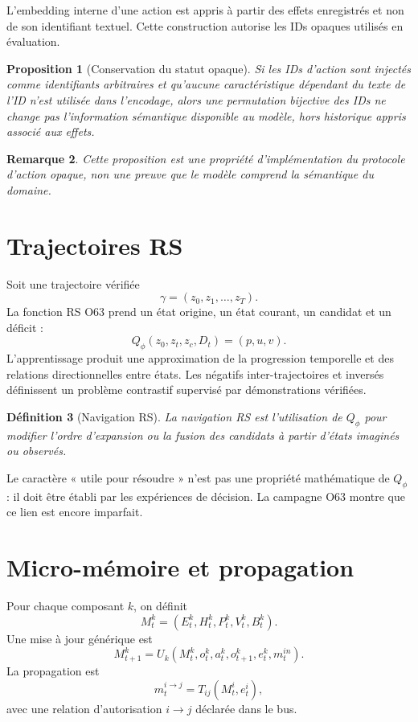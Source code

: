 \documentclass[11pt,a4paper]{article}
\newtheorem{definition}{Définition}[section]
\newtheorem{proposition}[definition]{Proposition}
\newtheorem{remark}[definition]{Remarque}
\begin{document}
L’embedding interne d’une action est appris à partir des effets enregistrés et non de son identifiant textuel. Cette construction autorise les IDs opaques utilisés en évaluation.

\begin{proposition}[Conservation du statut opaque]
Si les IDs d’action sont injectés comme identifiants arbitraires et qu’aucune caractéristique dépendant du texte de l’ID n’est utilisée dans l’encodage, alors une permutation bijective des IDs ne change pas l’information sémantique disponible au modèle, hors historique appris associé aux effets.
\end{proposition}

\begin{remark}
Cette proposition est une propriété d’implémentation du protocole d’action opaque, non une preuve que le modèle comprend la sémantique du domaine.
\end{remark}

\section{Trajectoires RS}
Soit une trajectoire vérifiée
\[
\gamma=(z_0,z_1,\ldots,z_T).
\]
La fonction RS O63 prend un état origine, un état courant, un candidat et un déficit :
\[
Q_\phi(z_0,z_t,z_c,D_t)=(p,u,v).
\]
L’apprentissage produit une approximation de la progression temporelle et des relations directionnelles entre états. Les négatifs inter-trajectoires et inversés définissent un problème contrastif supervisé par démonstrations vérifiées.

\begin{definition}[Navigation RS]
La navigation RS est l’utilisation de $Q_\phi$ pour modifier l’ordre d’expansion ou la fusion des candidats à partir d’états imaginés ou observés.
\end{definition}

Le caractère « utile pour résoudre » n’est pas une propriété mathématique de $Q_\phi$ : il doit être établi par les expériences de décision. La campagne O63 montre que ce lien est encore imparfait.

\section{Micro-mémoire et propagation}
Pour chaque composant $k$, on définit
\[
M_t^k=(E_t^k,H_t^k,P_t^k,V_t^k,B_t^k).
\]
Une mise à jour générique est
\[
M_{t+1}^k=U_k(M_t^k,o_t^k,a_t^k,o_{t+1}^k,e_t^k,m_t^{in}).
\]
La propagation est
\[
m_t^{i\to j}=T_{ij}(M_t^i,e_t^i),
\]
avec une relation d’autorisation $i\to j$ déclarée dans le bus.
\end{document}
